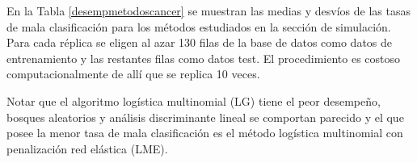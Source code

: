 \documentclass{report}
\begin{document}
 
 \begin{table}[h]
 	\mbox{}\hfill
 	
 	
 	\caption{  Frecuencias absolutas de las clases de localizaciones del  cáncer} 
 	\label{cancer}
 	
 \end{table} 
 
 
 En la Tabla \ref{desempmetodoscancer} se muestran las medias y desvíos de las tasas de mala clasificación  para los métodos estudiados en la sección de simulación. Para cada réplica se eligen al azar 130 filas de la base de datos como datos de entrenamiento y las restantes filas como datos test. El procedimiento es costoso computacionalmente de allí que se replica 10 veces. 
 
 Notar que el algoritmo logística multinomial (LG) tiene el peor desempeño, bosques aleatorios y análisis discriminante lineal se comportan parecido y el que posee la menor tasa de mala clasificación  es el método logística multinomial con penalización red elástica (LME).
 
 
 
\end{document}

